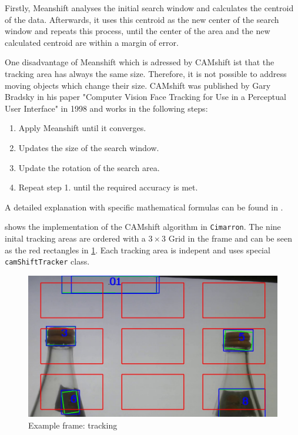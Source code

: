 Firstly, Meanshift analyses the initial search window and calculates the centroid of the data. Afterwards, it uses this centroid as the new center of the search window and repeats this process, until the center of the area and the new calculated centroid are within a margin of error.

One disadvantage of Meanshift which is adressed by CAMshift ist that the tracking area has always the same size. Therefore, it is not possible to address moving objects which change their size. CAMshift was published by Gary Bradsky in his paper "Computer Vision Face Tracking for Use in a Perceptual User Interface" in 1998 and works in the following steps:
\begin{enumerate}
    \item Apply Meanshift until it converges.
    \item Updates the size of the search window.
    \item Update the rotation of the search area.
    \item Repeat step 1. until the required accuracy is met.
\end{enumerate}

A detailed explanation with specific mathematical formulas can be found in \cite{Bradski98computervision}.

\begin{figure}[ht!]\centering
\end{figure}

 shows the implementation of the CAMshift algorithm in \texttt{Cimarron}. The nine inital tracking areas are ordered with a $3\times 3$ Grid in the frame and can be seen as the red rectangles in \cref{fig:example:cam}. Each tracking area is indepent and uses special \texttt{camShiftTracker} class.

\begin{figure}\centering
    \includegraphics[scale=0.35]{images/tracking-example.jpg}
    \caption{Example frame: tracking}
    \label{fig:example:cam}
\end{figure}

